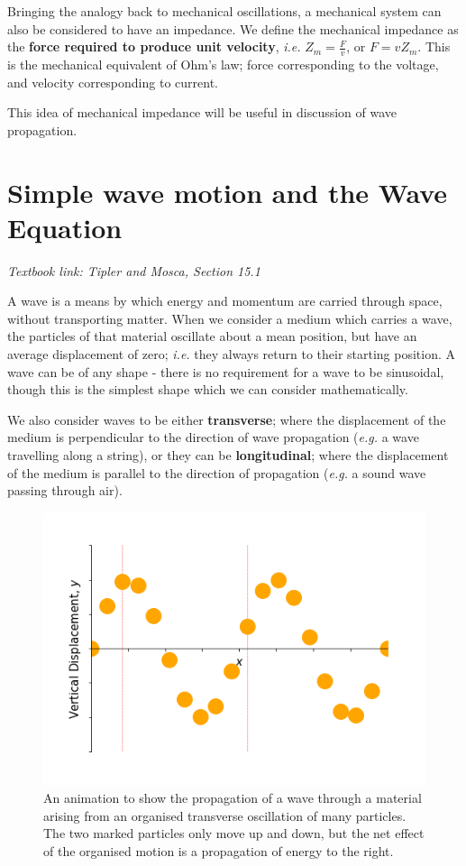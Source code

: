 \documentclass[
]{book}
\begin{document}
Bringing the analogy back to mechanical oscillations, a mechanical system can also be considered to have an impedance. We define the mechanical impedance as the \textbf{force required to produce unit velocity}, \emph{i.e.} \(Z_m = \frac{F}{v}\), or \(F = vZ_m\). This is the mechanical equivalent of Ohm's law; force corresponding to the voltage, and velocity corresponding to current.

This idea of mechanical impedance will be useful in discussion of wave propagation.

\hypertarget{sec-ch6-wavemotion}{%
\chapter{Simple wave motion and the Wave Equation}\label{sec-ch6-wavemotion}}

\emph{Textbook link: Tipler and Mosca, Section 15.1}

A wave is a means by which energy and momentum are carried through space, without transporting matter. When we consider a medium which carries a wave, the particles of that material oscillate about a mean position, but have an average displacement of zero; \emph{i.e.} they always return to their starting position. A wave can be of any shape - there is no requirement for a wave to be sinusoidal, though this is the simplest shape which we can consider mathematically.

We also consider waves to be either \textbf{transverse}; where the displacement of the medium is perpendicular to the direction of wave propagation (\emph{e.g.} a wave travelling along a string), or they can be \textbf{longitudinal}; where the displacement of the medium is parallel to the direction of propagation (\emph{e.g.} a sound wave passing through air).

\begin{figure}

{\centering \includegraphics[width=0.7\linewidth]{visualisations/ch6-transversewave2} 

}

\caption{An animation to show the propagation of a wave through a material arising from an organised transverse oscillation of many particles. The two marked particles only move up and down, but the net effect of the organised motion is a propagation of energy to the right.}\label{fig:ch6-transversewaveill1}
\end{figure}
\end{document}
